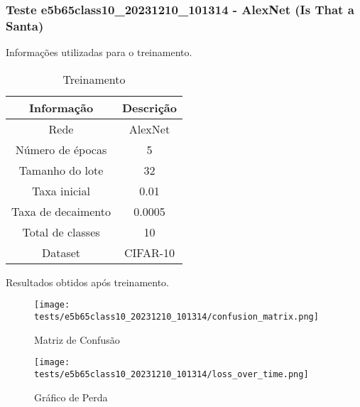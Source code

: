 \subsubsection{Teste e5b65class10_20231210_101314 - AlexNet (Is That a Santa)}

Informações utilizadas para o treinamento.

\begin{table}[ht]
   \centering
   \caption{Treinamento}
   \label{tab:modelos}
   \begin{tabular}{| c | c | }
      \hline 
      \textbf{Informação} & \textbf{Descrição} \\
      \hline \hline 
      Rede & AlexNet \\
      \hline
      Número de épocas & 5\\
      \hline
      Tamanho do lote & 32\\
      \hline
      Taxa inicial & 0.01 \\
      \hline
      Taxa de decaimento & 0.0005 \\
      \hline
      Total de classes & 10\\
      \hline
      Dataset & CIFAR-10\\
      \hline
   \end{tabular} 
\end{table}

Resultados obtidos após treinamento.


\begin{figure}[ht]
 \begin{center}
   \texttt{[image: tests/e5b65class10\_20231210\_101314/confusion\_matrix.png]}
  \caption{Matriz de Confusão}
  \label{fig:fig03}
 \end{center}
\end{figure}

\begin{figure}[ht]
 \begin{center}
   \texttt{[image: tests/e5b65class10\_20231210\_101314/loss\_over\_time.png]}
  \caption{Gráfico de Perda}
  \label{fig:fig04}
 \end{center}
\end{figure}
